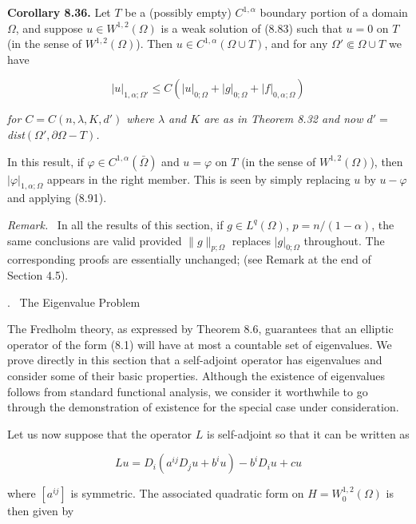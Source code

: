 \medskip

\textbf{Corollary 8.36.} Let $T$ be a (possibly empty) $C^{1,\alpha}$ boundary portion of a domain $\Omega$, and suppose $u \in W^{1,2}(\Omega)$ is a weak solution of (8.83) such that $u = 0$ on $T$ (in the sense of $W^{1,2}(\Omega)$). Then $u \in C^{1,\alpha}(\Omega \cup T)$, and for any $\Omega' \Subset \Omega \cup T$ we have

\begin{equation}
\tag{8.91}
\lvert u \rvert_{1,\alpha;\Omega'} \le C(\lvert u \rvert_{0;\Omega} + \lvert g \rvert_{0;\Omega} + \lvert f \rvert_{0,\alpha;\Omega})
\end{equation}

\textit{for $C = C(n,\lambda,K,d')$ where $\lambda$ and $K$ are as in Theorem 8.32 and now $d' =$ dist$(\Omega', \partial\Omega - T)$.}

\medskip

In this result, if $\varphi \in C^{1,\alpha}(\bar{\Omega})$ and $u = \varphi$ on $T$ (in the sense of $W^{1,2}(\Omega)$), then $\lvert \varphi \rvert_{1,\alpha;\Omega}$ appears in the right member. This is seen by simply replacing $u$ by $u-\varphi$ and applying (8.91).

\medskip

\textit{Remark.} \ In all the results of this section, if $g \in L^q(\Omega)$, $p = n/(1-\alpha)$, the same conclusions are valid provided $\lVert g \rVert_{p;\Omega}$ replaces $\lvert g \rvert_{0;\Omega}$ throughout. The corresponding proofs are essentially unchanged; (see Remark at the end of Section 4.5).

\bigskip

. \ The Eigenvalue Problem

\medskip

The Fredholm theory, as expressed by Theorem 8.6, guarantees that an elliptic operator of the form (8.1) will have at most a countable set of eigenvalues. We prove directly in this section that a self-adjoint operator has eigenvalues and consider some of their basic properties. Although the existence of eigenvalues follows from standard functional analysis, we consider it worthwhile to go through the demonstration of existence for the special case under consideration.

Let us now suppose that the operator $L$ is self-adjoint so that it can be written as

\[
Lu = D_i(a^{ij}D_j u + b^i u) - b^i D_i u + cu
\]

where $[a^{ij}]$ is symmetric. The associated quadratic form on $H = W^{1,2}_0(\Omega)$ is then given by

